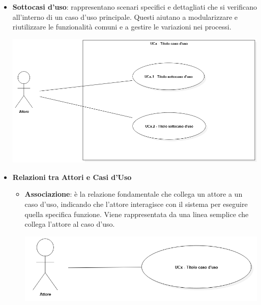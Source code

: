 \begin{itemize}
\begin{center}
		\end{center}
	\newpage
	\item \textbf{Sottocasi d'uso}: rappresentano scenari specifici e dettagliati che si verificano all'interno di un caso d'uso principale. Questi aiutano a modularizzare e riutilizzare le funzionalità comuni e a gestire le variazioni nei processi.
		\begin{center}
			\includegraphics*[width=17cm]{../../../images/norme_di_progetto/sottocasiDiUso.png}
		\end{center}
	\newpage
	
	\item \textbf{Relazioni tra Attori e Casi d'Uso}
	    \begin{itemize}
			\item \textbf{Associazione}: è la relazione fondamentale che collega un attore a un caso d'uso, indicando che l'attore interagisce con il sistema per eseguire quella specifica funzione. Viene rappresentata da una linea semplice che collega l'attore al caso d'uso.

				\begin{center}
					\includegraphics*[width=15cm]{../../../images/norme_di_progetto/associazione.png}
				\end{center}
	    \end{itemize} 


\end{itemize}
